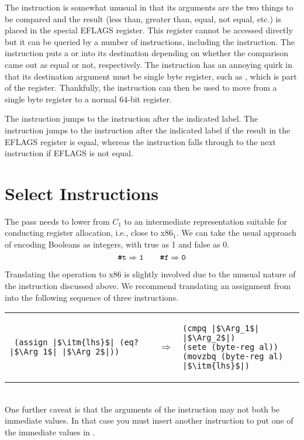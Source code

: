 \documentclass[11pt]{book}
\begin{document}
The  instruction is somewhat unusual in that its arguments
are the two things to be compared and the result (less than, greater
than, equal, not equal, etc.) is placed in the special EFLAGS
register. This register cannot be accessed directly but it can be
queried by a number of instructions, including the 
instruction. The  instruction puts a  or  into
its destination depending on whether the comparison came out as equal
or not, respectively. The  instruction has an annoying quirk
in that its destination argument must be single byte register, such as
, which is part of the  register.  Thankfully, the
 instruction can then be used to move from a single byte
register to a normal 64-bit register.

The  instruction jumps to the instruction after the indicated
label.  The  instruction jumps to the instruction after the
indicated label if the result in the EFLAGS register is equal, whereas
the  instruction falls through to the next instruction if
EFLAGS is not equal.

\section{Select Instructions}
\label{sec:select-r2}

The  pass needs to lower from $C_1$ to an
intermediate representation suitable for conducting register
allocation, i.e., close to x86$_1$. We can take the usual approach of
encoding Booleans as integers, with true as 1 and false as 0.
\[
\texttt{\#t} \Rightarrow \texttt{1}
\qquad
\texttt{\#f} \Rightarrow \texttt{0}
\]

Translating the  operation to x86 is slightly involved due
to the unusual nature of the  instruction discussed above.
We recommend translating an assignment from  into the
following sequence of three instructions. \\
\begin{tabular}{lll}
\begin{minipage}{0.4\textwidth}
\begin{lstlisting}
 (assign |$\itm{lhs}$| (eq? |$\Arg_1$| |$\Arg_2$|))
\end{lstlisting}
\end{minipage}
&
$\Rightarrow$
&
\begin{minipage}{0.4\textwidth}
\begin{lstlisting}
(cmpq |$\Arg_1$| |$\Arg_2$|)
(sete (byte-reg al))
(movzbq (byte-reg al) |$\itm{lhs}$|)
\end{lstlisting}
\end{minipage}
\end{tabular}  \\
One further caveat is that the arguments of the  instruction
may not both be immediate values. In that case you must insert another
 instruction to put one of the immediate values in
.
\end{document}

